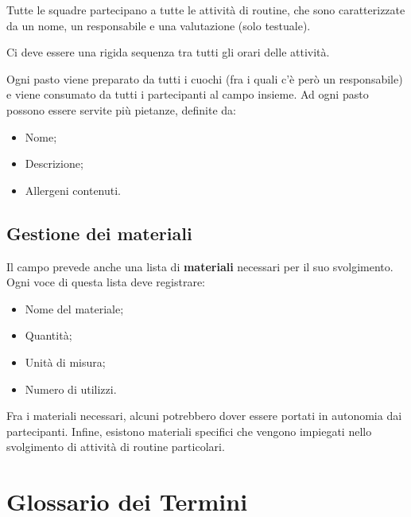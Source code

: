 \documentclass[11pt,a4paper]{article}
\begin{document}
Tutte le squadre partecipano a tutte le attività di routine, che sono caratterizzate da un nome,
un responsabile e una valutazione (solo testuale).

Ci deve essere una rigida sequenza tra tutti gli orari delle attività.

Ogni pasto viene preparato da tutti i cuochi (fra i quali c'è però un responsabile) e viene
consumato da tutti i partecipanti al campo insieme. Ad ogni pasto possono essere servite più
pietanze, definite da:

\begin{itemize}[nosep]
  \item Nome;
  \item Descrizione;
  \item Allergeni contenuti.
\end{itemize}

\subsection{Gestione dei materiali}

Il campo prevede anche una lista di \textbf{materiali} necessari per il suo svolgimento. Ogni voce
di questa lista deve registrare:

\begin{itemize}[nosep]
  \item Nome del materiale;
  \item Quantità;
  \item Unità di misura;
  \item Numero di utilizzi.
\end{itemize}

Fra i materiali necessari, alcuni potrebbero dover essere portati in autonomia dai partecipanti.
Infine, esistono materiali specifici che vengono impiegati nello svolgimento di attività di
routine particolari.


\section{Glossario dei Termini}
\end{document}
